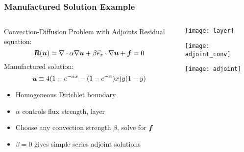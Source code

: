 \begin{frame}
\frametitle{Manufactured Solution Example}
\begin{columns}
\begin{column}{.7\textwidth}
\begin{block}{Convection-Diffusion Problem with Adjoints}
Residual equation:
\begin{equation*}
{\boldsymbol{R}}({\boldsymbol{u}}) = \nabla \cdot \alpha \nabla {\boldsymbol{u}} + \beta \vec{e}_x \cdot \nabla
{\boldsymbol{u}} + {\boldsymbol{f}} = 0
\end{equation*}
Manufactured solution:
\begin{equation*}
{\boldsymbol{u}} \equiv 4(1 - e^{-\alpha x} - (1 - e^{-\alpha})x)y(1-y)
\end{equation*}
\begin{itemize}
\item Homogeneous Dirichlet boundary
\item $\alpha$ controls flux strength, layer
\item Choose any convection strength $\beta$, solve for ${\boldsymbol{f}}$
\item $\beta = 0$ gives simple series adjoint solutions
\end{itemize}
\end{block}
\end{column}
\begin{column}{.3\textwidth}
\texttt{[image: layer]}

\texttt{[image: adjoint\_conv]}

\texttt{[image: adjoint]}
\end{column}
\end{columns}

\end{frame}

